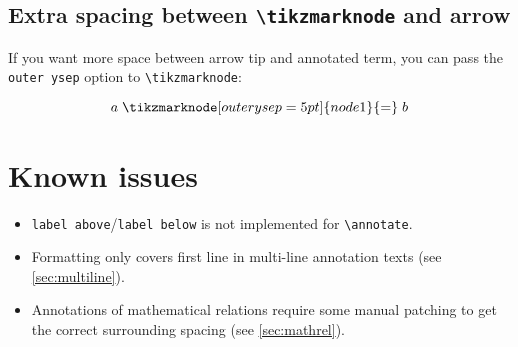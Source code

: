 \documentclass{article}
\begin{document}
\subsection{Extra spacing between \texttt{\textbackslash{}tikzmarknode} and arrow}
\label{sec:outerysep}

If you want more space between arrow tip and annotated term, you can pass the \texttt{outer ysep} option to \texttt{\textbackslash{}tikzmarknode}:
\begin{LTXexample}[text outside listing,lefthand width=0.5in]
\[
a \mathrel{\tikzmarknode[outer ysep=5pt]{node1}{=}} b
\]
\end{LTXexample}



\section{Known issues}

\begin{itemize}
    \item \texttt{label above}/\texttt{label below} is not implemented for \verb|\annotate|.

    \item Formatting only covers first line in multi-line annotation texts (see \cref{sec:multiline}).
    \item Annotations of mathematical relations require some manual patching to get the correct surrounding spacing (see \cref{sec:mathrel}).

\end{itemize}
\end{document}
